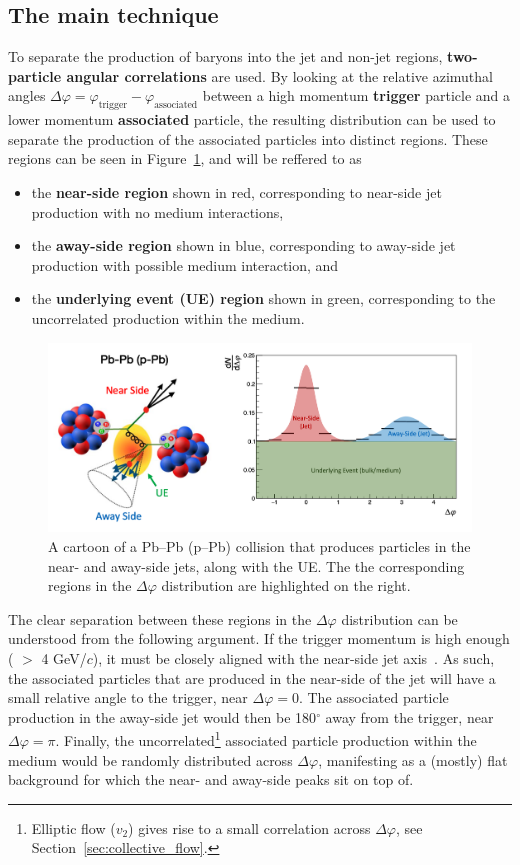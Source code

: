 \subsection{The main technique}
To separate the production of \lmb baryons into the jet and non-jet regions, \textbf{two-particle angular correlations} are used. By looking at the relative azimuthal angles $\Delta\varphi = \varphi_{\text{trigger}} - \varphi_{\text{associated}}$ between a high momentum \textbf{trigger} particle and a lower momentum \textbf{associated} particle, the resulting distribution can be used to separate the production of the associated particles into distinct regions. These regions can be seen in Figure~\ref{fig:dphi_cartoon}, and will be reffered to as
%
\begin{itemize}
\item the \textbf{near-side region} shown in red, corresponding to near-side jet production with no medium interactions, 
\item the \textbf{away-side region} shown in blue, corresponding to away-side jet production with possible medium interaction, and
\item the \textbf{underlying event (UE) region} shown in green, corresponding to the uncorrelated production within the medium.
\end{itemize}
%
\begin{figure}
\centering
\includegraphics[width=\textwidth]{figures/mnm/dphi_cartoon.png}
\caption{A cartoon of a Pb--Pb (p--Pb) collision that produces particles in the near- and away-side jets, along with the UE. The the corresponding regions in the $\Delta\varphi$ distribution are highlighted on the right.}
\label{fig:dphi_cartoon}
\end{figure}

The clear separation between these regions in the $\Delta\varphi$ distribution can be understood from the following argument. If the trigger momentum is high enough ( $>$ 4 GeV/$c$), it must be closely aligned with the near-side jet axis~\cite{JetAxisArgument}. As such, the associated particles that are produced in the near-side of the jet will have a small relative angle to the trigger, near $\Delta\varphi = 0$. The associated particle production in the away-side jet would then be 180$^\circ$ away from the trigger, near $\Delta\varphi = \pi$. Finally, the uncorrelated\footnote{Elliptic flow ($v_2$) gives rise to a small correlation across $\Delta\varphi$, see Section~\ref{sec:collective_flow}.} associated particle production within the medium would be randomly distributed across $\Delta\varphi$, manifesting as a (mostly) flat background for which the near- and away-side peaks sit on top of. 


